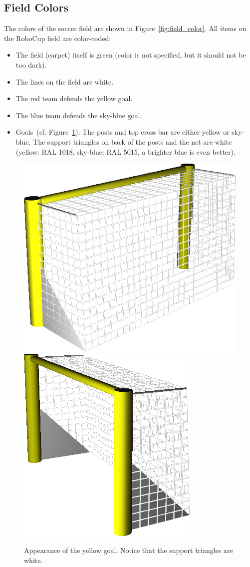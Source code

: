 \documentclass[12pt]{article}
\newcommand{\cf}{\mbox{cf.}\xspace}
\begin{document}
\subsection{Field Colors}

The colors of the soccer field are shown in Figure~\ref{fig:field_color}. All items on the RoboCup field are color-coded:

\begin{itemize}

\item The field (carpet) itself is green (color is not specified, but it should not be too dark).

\item The lines on the field are white.

\item The red team defends the yellow goal.

\item The blue team defends the sky-blue goal.

\item Goals~(\cf Figure~\ref{fig:goal_colors}). The posts and top cross bar are either yellow or sky-blue. The support triangles on back of the posts and the net are white (yellow: RAL 1018, sky-blue: RAL 5015, a brighter blue is even better).

\end{itemize}

\begin{figure}[t]
\begin{center}
\leavevmode
\includegraphics[width=0.5\columnwidth]{figs/goal_2010_back.png}\qquad
\includegraphics[width=0.4\columnwidth]{figs/goal_2010_front.png}
\caption{Appearance of the yellow goal. Notice that the support triangles are white.}
\label{fig:goal_colors}
\end{center}
\end{figure}
\end{document}
